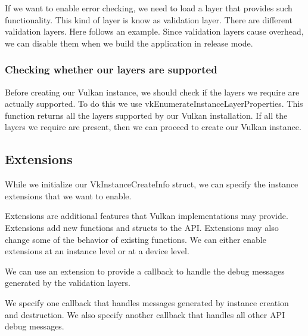 If we want to enable error checking, we need to load a layer that
provides such functionality.
This kind of layer is know as validation layer.
There are different validation layers.
Here follows an example. Since validation layers cause overhead, we can
disable them when we build the application in release mode.

\begin{minipage}{\linewidth}{\noindent}
    
\end{minipage}

\subsubsection{Checking whether our layers are supported}

Before creating our Vulkan instance, we should check if the layers we require are
actually supported.
To do this we use vkEnumerateInstanceLayerProperties.
This function returns all the layers supported by our Vulkan installation.
If all the layers we require are present, then we can proceed to create our
Vulkan instance.

\subsection{Extensions}

While we initialize our VkInstanceCreateInfo struct, we can specify the instance
extensions that we want to enable.

Extensions are  additional features that Vulkan implementations may provide.
Extensions add new functions and structs to the API.
Extensions may also change some of the behavior of existing functions.
We can either enable extensions at an instance level or at a device level.

We can use an extension to provide a callback to handle the debug messages
generated by the validation layers.

\begin{minipage}{\linewidth}{\noindent}
    
\end{minipage}

We specify one callback that handles messages generated by
instance creation and destruction.
We also specify another callback that handles all other API debug messages.


